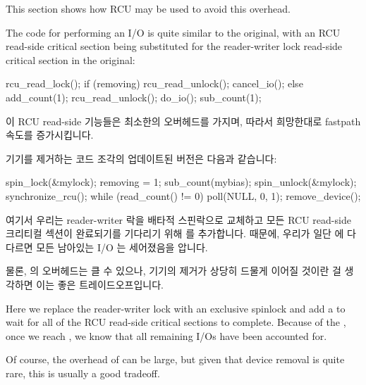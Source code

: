 This section shows how RCU may be used to avoid this overhead.

The code for performing an I/O is quite similar to the original, with
an RCU read-side critical section being substituted for the reader-writer
lock read-side critical section in the original:

\fi

\begin{VerbatimN}[tabsize=8]
rcu_read_lock();
if (removing) {
	rcu_read_unlock();
	cancel_io();
} else {
	add_count(1);
	rcu_read_unlock();
	do_io();
	sub_count(1);
}
\end{VerbatimN}
\vspace{5pt}

이 RCU read-side 기능들은 최소한의 오버헤드를 가지며, 따라서 희망한대로
fastpath 속도를 증가시킵니다.

기기를 제거하는 코드 조각의 업데이트된 버전은 다음과 같습니다:

\iffalse

The RCU read-side primitives have minimal overhead, thus speeding up
the fastpath, as desired.

The updated code fragment removing a device is as follows:

\fi

\begin{fcvlabel}
\begin{VerbatimN}[tabsize=8,commandchars=\\\[\]]
spin_lock(&mylock);
removing = 1;
sub_count(mybias);
spin_unlock(&mylock);
synchronize_rcu();
while (read_count() != 0) {	\lnlbl[nextofsync]
	poll(NULL, 0, 1);
}
remove_device();
\end{VerbatimN}
\end{fcvlabel}

\begin{fcvref}
여기서 우리는 reader-writer 락을 배타적 스핀락으로 교체하고 모든 RCU read-side
크리티컬 섹션이 완료되기를 기다리기 위해  를 추가합니다.
 때문에, 우리가 일단  에 다다르면 모든
남아있는 I/O 는 세어졌음을 압니다.

물론,  의 오버헤드는 클 수 있으나, 기기의 제거가 상당히
드물게 이어질 것이란 걸 생각하면 이는 좋은 트레이드오프입니다.
\end{fcvref}

\iffalse

\begin{fcvref}
Here we replace the reader-writer lock with an exclusive spinlock and
add a  to wait for all of the RCU read-side
critical sections to complete.
Because of the ,
once we reach ,
we know that all remaining I/Os have been accounted for.

Of course, the overhead of  can be large,
but given that device removal is quite rare, this is usually a good
tradeoff.
\end{fcvref}

